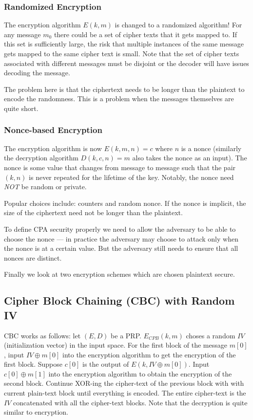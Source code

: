 \documentclass[twoside]{article}
\def\xor{\oplus}
\begin{document}
\subsubsection{Randomized Encryption}
The encryption algorithm $E(k,m)$ is changed to a randomized algorithm! For any message $m_0$ there could be a set of cipher texts that it gets mapped to. If this set is sufficiently large, the risk that multiple instances of the same message gets mapped to the same cipher text is small. Note that the set of cipher texts associated with different messages must be disjoint or the decoder will have issues decoding the message.

The problem here is that the ciphertext needs to be longer than the plaintext to encode the randomness. This is a problem when the messages themselves are quite short.

\subsubsection{Nonce-based Encryption}
The encryption algorithm is now $E(k,m,n) = c$ where $n$ is a nonce (similarly the decryption algorithm $D(k,c,n) = m$ also takes the nonce as an input). The nonce is some value that changes from message to message such that the pair $(k,n)$ is never repeated for the lifetime of the key. Notably, the nonce need \emph{NOT} be random or private. 

Popular choices include: counters and random nonce. If the nonce is implicit, the size of the ciphertext need not be longer than the plaintext.

To define CPA security properly we need to allow the adversary to be able to choose the nonce --- in practice the adversary may choose to attack only when the nonce is at a certain value. But the adversary still needs to ensure that all nonces are distinct.

Finally we look at two encryption schemes which are chosen plaintext secure.

\subsection{Cipher Block Chaining (CBC) with Random IV}

CBC works as follows: let $(E, D)$ be a PRP. $E_{CPB}(k,m)$ choses a random $IV$ (initialization vector) in the input space. For the first block of the message $m[0]$, input $IV \xor m[0]$ into the encryption algorithm to get the encryption of the first block. Suppose $c[0]$ is the output of $E(k, IV\xor m[0])$. Input $c[0] \xor m[1]$ into the encryption algorithm to obtain the encryption of the second block. Continue XOR-ing the cipher-text of the previous block with with current plain-text block until everything is encoded. The entire cipher-text is the $IV$ concatenated with all the cipher-text blocks. Note that the decryption is quite similar to encryption.
\end{document}
